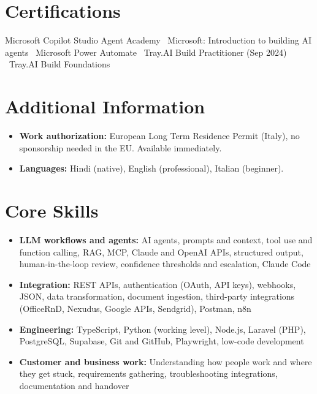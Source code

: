 \documentclass[a4paper,11pt]{article}
\begin{document}
\section{Certifications}
Microsoft Copilot Studio Agent Academy \textbullet\ Microsoft: Introduction to building AI agents \textbullet\ Microsoft Power Automate \textbullet\ Tray.AI Build Practitioner (Sep 2024) \textbullet\ Tray.AI Build Foundations

\section{Additional Information}
\begin{itemize}
 \item \textbf{Work authorization:} European Long Term Residence Permit (Italy), no sponsorship needed in the EU. Available immediately.
 \item \textbf{Languages:} Hindi (native), English (professional), Italian (beginner).
\end{itemize}

\section{Core Skills}
\begin{itemize}
 \item \textbf{LLM workflows and agents:} AI agents, prompts and context, tool use and function calling, RAG, MCP, Claude and OpenAI APIs, structured output, human-in-the-loop review, confidence thresholds and escalation, Claude Code
 \item \textbf{Integration:} REST APIs, authentication (OAuth, API keys), webhooks, JSON, data transformation, document ingestion, third-party integrations (OfficeRnD, Nexudus, Google APIs, Sendgrid), Postman, n8n
 \item \textbf{Engineering:} TypeScript, Python (working level), Node.js, Laravel (PHP), PostgreSQL, Supabase, Git and GitHub, Playwright, low-code development
 \item \textbf{Customer and business work:} Understanding how people work and where they get stuck, requirements gathering, troubleshooting integrations, documentation and handover
\end{itemize}
\end{document}
